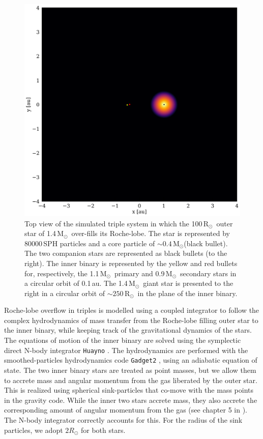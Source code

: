 \documentclass{aastex62}
\newcommand{\MSun}{\mbox{M$_\odot$}}
\newcommand{\RSun}{\mbox{R$_\odot$}}
\begin{document}
\begin{figure}[ht!]
  \includegraphics[width=\columnwidth]{fig_BBSS_gas_M14Msun_A010au_t0002.pdf}
\caption{Top view of the simulated triple system in which the
  100\,\RSun\, outer star of 1.4\,\MSun\, over-fills its
  Roche-lobe.  The star is represented by 80000\,SPH particles and a
  core particle of $\sim 0.4$\,\MSun (black bullet). The two companion
  stars are represented as black bullets (to the right).  The inner
  binary is represented by the yellow and red bullets for, respectively, the
  1.1\,\MSun\, primary and 0.9\,\MSun\, secondary stars in a circular
  orbit of 0.1\,au. The 1.4\,\MSun\, giant star is presented to the
  right in a circular orbit of $\sim 250$\,\RSun\, in the plane of the
  inner binary.
\label{fig:topview_at_t0}}
\end{figure}

Roche-lobe overflow in triples is modelled using a coupled integrator
to follow the complex hydrodynamics of mass transfer from the
Roche-lobe filling outer star to the inner binary, while keeping track
of the gravitational dynamics of the stars.  The equations of motion
of the inner binary are solved using the symplectic direct N-body
integrator \texttt{Huayno} \citep{2012NewA...17..711P}. The
hydrodynamics are performed with the smoothed-particles hydrodynamics
code \texttt{Gadget2} \citep{2000ascl.soft03001S}, using an adiabatic
equation of state.  The two inner binary stars are treated as point
masses, but we allow them to accrete mass and angular momentum from
the gas liberated by the outer star.  This is realized using spherical
sink-particles that co-move with the mass points in the gravity
code. While the inner two stars accrete mass, they also accrete the
corresponding amount of angular momentum from the gas (see chapter 5
in \cite{AMUSE}).  The N-body integrator correctly accounts for this.
For the radius of the sink particles, we adopt $2 R_\odot$ for both
stars.
\end{document}
